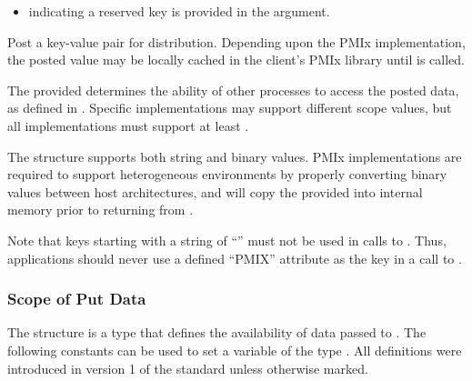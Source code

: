 \begin{arglist}
\end{arglist}

\returnstart
\begin{itemize}
\item {} indicating a reserved key is provided in the  argument.
\end{itemize}
\returnend

\descr

Post a key-value pair for distribution. Depending upon the \ac{PMIx} implementation, the posted value may be locally cached in the client's \ac{PMIx} library until  is called.

The provided  determines the ability of other processes to access the posted data, as defined in .
Specific implementations may support different scope values, but all implementations must support at least .

The  structure supports both string and binary values.
\ac{PMIx} implementations are required to support heterogeneous environments by properly converting binary values between host architectures, and will copy the provided  into internal memory prior to returning from .

\adviceuserstart
Note that keys starting with a string of ``'' must not be used in calls to . Thus, applications should never use a defined ``PMIX'' attribute as the key in a call to .
\adviceuserend


\subsubsection{Scope of Put Data}
\label{api:nres:scope}

The  structure is a  type that defines the availability of data passed to .
The following constants can be used to set a variable of the type . All definitions were introduced in version 1 of the standard unless otherwise marked.

